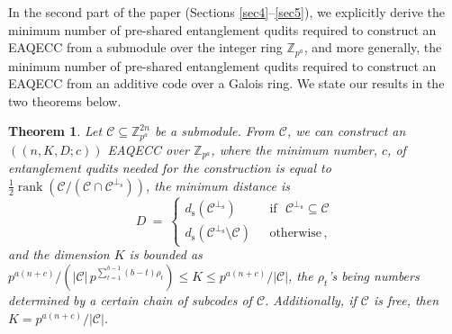 \documentclass{article}
\DeclareMathOperator{\rank}{rank}
\def\Z{\mathbb{Z}}
\newtheorem{thm}{Theorem}[section]
\newtheorem{cor}{Corollary}[section]
\theoremstyle{remark}
\theoremstyle{definition}
\numberwithin{equation}{section}
\begin{document}
\medskip
 
In the second part of the paper (Sections \ref{sec4}--\ref{sec5}), we explicitly derive the minimum number of pre-shared entanglement qudits required to construct an EAQECC from a submodule over the integer ring $\Z_{p^a}$, and more generally, the minimum number of pre-shared entanglement qudits required to construct an EAQECC from an additive code over a Galois ring.  We state our results in the two theorems below. 

\begin{thm}\label{dt2} Let  $\mathcal{C} \subseteq \mathbb{Z}_{p^a}^{2n}$ be a submodule. From $\mathcal{C}$, we can construct an $((n,K, D; c))$ EAQECC over $\Z_{p^a}$, where the minimum number, $c$, of entanglement qudits needed for the construction is equal to $\frac12 \rank(\mathcal{C}/(\mathcal{C} \cap \mathcal{C}^{\perp_{\mathrm{s}}}))$,  the minimum distance is 
\begin{equation*}
D~=~\left\{\begin{array}{ll}
d_{\mathrm{s}}(\mathcal{C}^{\perp_{\mathrm{s}}}) & \text{~~if~~} \mathcal{C}^{\perp_{\mathrm{s}}} \subseteq \mathcal{C} \\  
d_{\mathrm{s}}(\mathcal{C}^{\perp_{\mathrm{s}}}\setminus \mathcal{C} )  & \text{~~otherwise} \, , \end{array}\right. 
\end{equation*}
and the dimension $K$ is bounded as $p^{a(n+c)}/ (|\mathcal{C}| \, {p^{\sum_{t=1}^{b-1} (b-t)\rho_t}}) \leq  K \leq p^{a(n+c)}/|\mathcal{C}|$, the $\rho_t$'s being numbers determined by a certain chain of subcodes of $\mathcal{C}$. Additionally, if $\mathcal{C}$ is free, then $K = p^{a(n+c)}/|\mathcal{C}|$.
 \end{thm}

\end{document}
